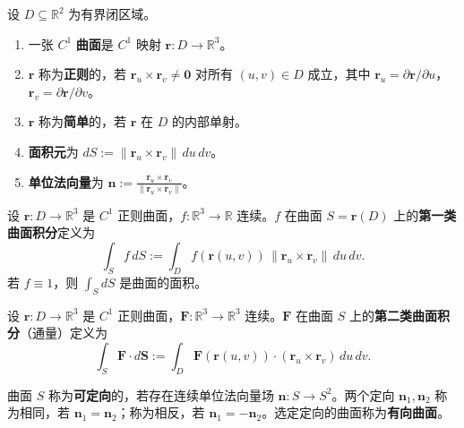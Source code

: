 \begin{definition}[曲面与参数化]\label{def:surface_parameterization}
设 $D \subseteq \mathbb{R}^2$ 为有界闭区域。
\begin{enumerate}[label=(\roman*)]
    \item 一张 $C^1$ \textbf{曲面}是 $C^1$ 映射 $\mathbf{r}: D \to \mathbb{R}^3$。
    \item $\mathbf{r}$ 称为\textbf{正则}的，若 $\mathbf{r}_u \times \mathbf{r}_v \neq \mathbf{0}$ 对所有 $(u, v) \in D$ 成立，其中 $\mathbf{r}_u = \partial \mathbf{r}/\partial u$，$\mathbf{r}_v = \partial \mathbf{r}/\partial v$。
    \item $\mathbf{r}$ 称为\textbf{简单}的，若 $\mathbf{r}$ 在 $D$ 的内部单射。
    \item \textbf{面积元}为 $dS := \|\mathbf{r}_u \times \mathbf{r}_v\| \, du \, dv$。
    \item \textbf{单位法向量}为 $\mathbf{n} := \frac{\mathbf{r}_u \times \mathbf{r}_v}{\|\mathbf{r}_u \times \mathbf{r}_v\|}$。
\end{enumerate}
\end{definition}

\begin{definition}\label{def:surface_integral_first_kind}
设 $\mathbf{r}: D \to \mathbb{R}^3$ 是 $C^1$ 正则曲面，$f: \mathbb{R}^3 \to \mathbb{R}$ 连续。$f$ 在曲面 $S = \mathbf{r}(D)$ 上的\textbf{第一类曲面积分}定义为
\[
\int_S f \, dS := \int_D f(\mathbf{r}(u, v)) \, \|\mathbf{r}_u \times \mathbf{r}_v\| \, du \, dv.
\]
若 $f \equiv 1$，则 $\int_S dS$ 是曲面的面积。
\end{definition}

\begin{definition}\label{def:surface_integral_second_kind}
设 $\mathbf{r}: D \to \mathbb{R}^3$ 是 $C^1$ 正则曲面，$\mathbf{F}: \mathbb{R}^3 \to \mathbb{R}^3$ 连续。$\mathbf{F}$ 在曲面 $S$ 上的\textbf{第二类曲面积分}（通量）定义为
\[
\int_S \mathbf{F} \cdot d\mathbf{S} := \int_D \mathbf{F}(\mathbf{r}(u, v)) \cdot (\mathbf{r}_u \times \mathbf{r}_v) \, du \, dv.
\]
\end{definition}

\begin{definition}[曲面的定向]\label{def:surface_orientation}
曲面 $S$ 称为\textbf{可定向}的，若存在连续单位法向量场 $\mathbf{n}: S \to S^2$。两个定向 $\mathbf{n}_1, \mathbf{n}_2$ 称为相同，若 $\mathbf{n}_1 = \mathbf{n}_2$；称为相反，若 $\mathbf{n}_1 = -\mathbf{n}_2$。选定定向的曲面称为\textbf{有向曲面}。
\end{definition}

